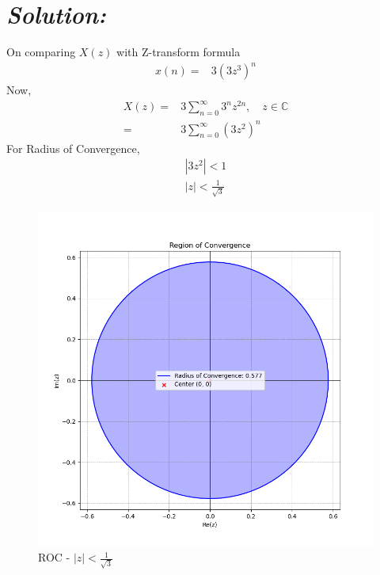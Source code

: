 \documentclass[journal,12pt,twocolumn]{IEEEtran}
\theoremstyle{remark}
\begin{document}
\section*{\textit{\textbf{Solution:}}}

On comparing $X(z)$ with Z-transform formula\\ 
\begin{align}
x(n)=&3{(3z^{3})}^{n}
\end{align}
Now,
\begin{align}
X(z) =& 3\sum_{n=0}^{\infty} 3^{n}z^{2n}, \quad z \in \mathbb{C}\\
=&3\sum_{n=0}^{\infty} {(3z^{2})}^{n}
 \end{align}
 For Radius of Convergence,
 \begin{align}
|3z^2| < 1\\
|z| < \frac{1}{\sqrt{3}}
 \end{align}
 \begin{figure}[h]
\renewcommand\thefigure{1}
    \centering
    \includegraphics[width=0.8\columnwidth]{figs/fig1.png}
    \caption{ROC - $|z|< \frac{1}{\sqrt{3}}$}
    \label{Fig1_GATE MA 28}
\end{figure}
\end{document}
